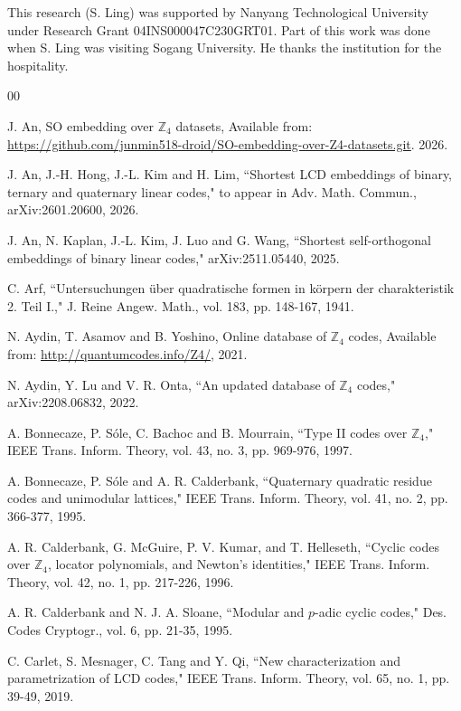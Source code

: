 \documentclass{article}
\theoremstyle{definition}
\theoremstyle{remark}
\begin{document}
This research (S. Ling) was supported by Nanyang Technological University under Research Grant 04INS000047C230GRT01. Part of this work was done when S. Ling was visiting Sogang University. He thanks the institution for the hospitality.

\begin{thebibliography}{00}

 J. An, SO embedding over $\mathbb{Z}_4$ datasets, Available from: \url{https://github.com/junmin518-droid/SO-embedding-over-Z4-datasets.git}. 2026.

 J. An, J.-H. Hong, J.-L. Kim and H. Lim, ``Shortest LCD embeddings of binary, ternary and quaternary linear codes," to appear in Adv. Math. Commun., arXiv:2601.20600, 2026.

 J. An, N. Kaplan, J.-L. Kim, J. Luo and G. Wang, ``Shortest self-orthogonal embeddings of binary linear codes," arXiv:2511.05440, 2025.

 C. Arf, ``Untersuchungen \"uber quadratische formen in k\"orpern der charakteristik 2. Teil I.," J. Reine Angew. Math., vol. 183, pp. 148-167, 1941.

 N. Aydin, T. Asamov and B. Yoshino, Online database of $\mathbb{Z}_4$ codes, Available from: \url{http://quantumcodes.info/Z4/}, 2021.

 N. Aydin, Y. Lu and V. R. Onta, ``An updated database of $\mathbb{Z}_4$ codes," arXiv:2208.06832, 2022.

 A. Bonnecaze, P. S\'ole, C. Bachoc and B. Mourrain, ``Type II codes over $\mathbb{Z}_4$," IEEE Trans. Inform. Theory, vol. 43, no. 3, pp. 969-976, 1997.

 A. Bonnecaze, P. S\'ole and A. R. Calderbank, ``Quaternary quadratic residue codes and unimodular lattices," IEEE Trans. Inform. Theory, vol. 41, no. 2, pp. 366-377, 1995.

A. R. Calderbank, G. McGuire, P. V. Kumar, and T. Helleseth,
``Cyclic codes over $\mathbb Z_4$, locator polynomials, and Newton's identities," IEEE Trans. Inform. Theory, vol. 42, no. 1, pp. 217-226, 1996.

 A. R. Calderbank and N. J. A. Sloane, ``Modular and $p$-adic cyclic codes," Des. Codes Cryptogr., vol. 6, pp. 21-35, 1995.

 C. Carlet, S. Mesnager, C. Tang and Y. Qi, ``New characterization and parametrization of LCD codes," IEEE Trans. Inform. Theory, vol. 65, no. 1, pp. 39-49, 2019.


\end{thebibliography}
\end{document}
